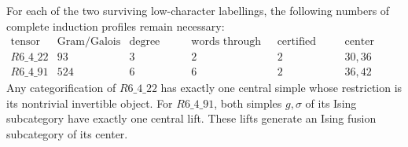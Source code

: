 \begin{proposition}
\label{prop:round4-quartic-frontier}
For each of the two surviving low-character labellings, the following
numbers of complete induction profiles remain necessary:
\[
\begin{array}{c|r|r|r|r|l}
\text{tensor}&\text{Gram/Galois}&\text{degree three}&
 \text{words through six}&\text{certified final}&\text{center ranks}\\\hline
R6\_4\_22&93&3&2&2&30,36\\
R6\_4\_91&524&6&6&2&36,42
\end{array}
\]
Any categorification of $R6\_4\_22$ has exactly one central simple whose
restriction is its nontrivial invertible object.  For $R6\_4\_91$, both
simples $g,\sigma$ of its Ising subcategory have exactly one central lift.
These lifts generate an Ising fusion subcategory of its center.
\end{proposition}
